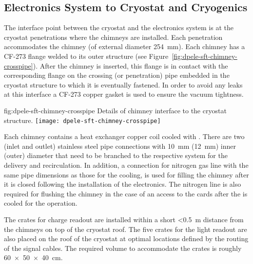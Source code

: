 \subsection{Electronics System to Cryostat and Cryogenics}
\label{sec:fddp-tpc-elec-intfc-cryo}

The interface point between the cryostat and the \dual electronics system is at the cryostat penetrations where the  chimneys are %
installed. Each penetration %
accommodates the chimney (of external diameter \SI{254}{\mm}). Each chimney has a CF-273 flange welded to its outer structure (see Figure~\ref{fig:dpele-sft-chimney-crosspipe}). After the chimney is inserted, this flange is in contact with the corresponding flange on the crossing (or penetration) pipe embedded in the cryostat structure to which it is eventually fastened. In order to avoid any leaks at this interface a CF-273 copper gasket is used to ensure the vacuum tightness.  

\begin{dunefigure}{fig:dpele-sft-chimney-crosspipe}
{Details of  chimney interface to the cryostat structure.}
\texttt{[image: dpele-sft-chimney-crosspipe]}
\end{dunefigure}

Each chimney contains a heat exchanger copper coil cooled with \lar. There are two (inlet and outlet) stainless steel pipe connections with \SI{10}{\mm} (\SI{12}{\mm}) inner (outer) diameter that need to be branched to the respective system for the \lar delivery and recirculation. In addition, %
a connection for nitrogen gas line with the same pipe dimensions as those for the \lar cooling, %
is used for filling the chimney after it is closed following the installation of the  electronics. The nitrogen line is also required for flushing the chimney in the case of an access to the  cards after the  is cooled for the operation. 

The  crates for charge readout %
are installed within a short \SI{<0.5}{\meter} distance from the  chimneys on top of the cryostat roof. The five  crates for the light readout are also placed on the roof of the cryostat at optimal locations defined by the routing of the  signal cables. The required volume to accommodate the crates is roughly \SI[product-units=power]{60x50x40}{\cm}. 

